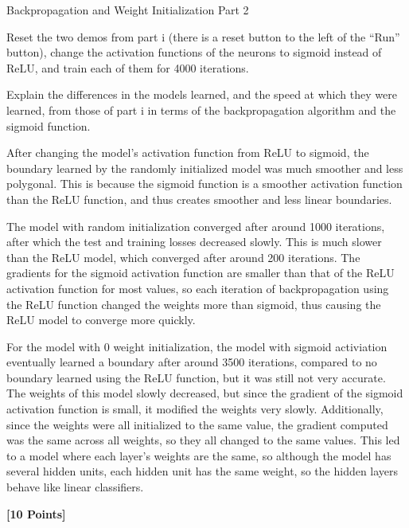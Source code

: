 \newpage

\begin{problem}[5]
    Backpropagation and Weight Initialization Part 2
\end{problem}
Reset the two demos from part i (there is a reset button to the left of the ``Run'' button), change the activation functions of the neurons to sigmoid instead of ReLU, and train each of them for 4000 iterations.

Explain the differences in the models learned, and the speed at which they were learned, from those of part i in terms of the backpropagation algorithm and the sigmoid function.

\begin{solution}
    After changing the model's activation function from ReLU to sigmoid, the boundary learned by the randomly initialized model was much smoother and less polygonal. This is because the sigmoid function is a smoother activation function than the ReLU function, and thus creates smoother and less linear boundaries.
    
    The model with random initialization converged after around 1000 iterations, after which the test and training losses decreased slowly. This is much slower than the ReLU model, which converged after around 200 iterations. The gradients for the sigmoid activation function are smaller than that of the ReLU activation function for most values, so each iteration of backpropagation using the ReLU function changed the weights more than sigmoid, thus causing the ReLU model to converge more quickly.

    For the model with 0 weight initialization, the model with sigmoid activiation eventually learned a boundary after around 3500 iterations, compared to no boundary learned using the ReLU function, but it was still not very accurate. The weights of this model slowly decreased, but since the gradient of the sigmoid activation function is small, it modified the weights very slowly. Additionally, since the weights were all initialized to the same value, the gradient computed was the same across all weights, so they all changed to the same values. This led to a model where each layer's weights are the same, so although the model has several hidden units, each hidden unit has the same weight, so the hidden layers behave like linear classifiers.
\end{solution}

\newpage

\problem \textbf{[10 Points]}

